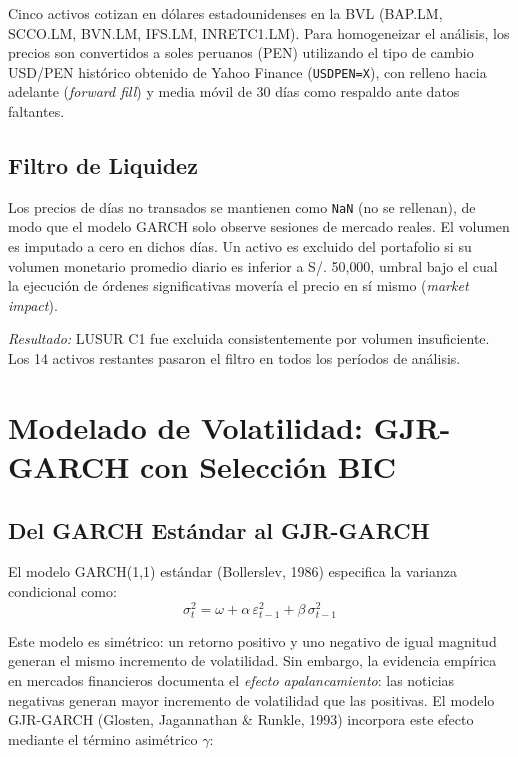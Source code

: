 \documentclass[11pt,a4paper]{article}
\begin{document}
Cinco activos cotizan en dólares estadounidenses en la BVL (BAP.LM, SCCO.LM, BVN.LM,
IFS.LM, INRETC1.LM). Para homogeneizar el análisis, los precios son convertidos a soles
peruanos (PEN) utilizando el tipo de cambio USD/PEN histórico obtenido de Yahoo Finance
(\texttt{USDPEN=X}), con relleno hacia adelante (\textit{forward fill}) y media móvil de
30 días como respaldo ante datos faltantes.

\subsection{Filtro de Liquidez}

Los precios de días no transados se mantienen como \texttt{NaN} (no se rellenan), de modo
que el modelo GARCH solo observe sesiones de mercado reales. El volumen es imputado a cero
en dichos días. Un activo es excluido del portafolio si su volumen monetario promedio diario
es inferior a S/. 50{,}000, umbral bajo el cual la ejecución de órdenes significativas
movería el precio en sí mismo (\textit{market impact}).

\textit{Resultado:} LUSUR C1 fue excluida consistentemente por volumen insuficiente. Los
14 activos restantes pasaron el filtro en todos los períodos de análisis.

\section{Modelado de Volatilidad: GJR-GARCH con Selección BIC}

\subsection{Del GARCH Estándar al GJR-GARCH}

El modelo GARCH(1,1) estándar (Bollerslev, 1986) especifica la varianza condicional como:
\begin{equation}
    \sigma^2_t = \omega + \alpha\,\varepsilon^2_{t-1} + \beta\,\sigma^2_{t-1}
\end{equation}

Este modelo es simétrico: un retorno positivo y uno negativo de igual magnitud generan el
mismo incremento de volatilidad. Sin embargo, la evidencia empírica en mercados financieros
documenta el \textit{efecto apalancamiento}: las noticias negativas generan mayor incremento
de volatilidad que las positivas. El modelo GJR-GARCH (Glosten, Jagannathan \& Runkle, 1993)
incorpora este efecto mediante el término asimétrico $\gamma$:
\end{document}
